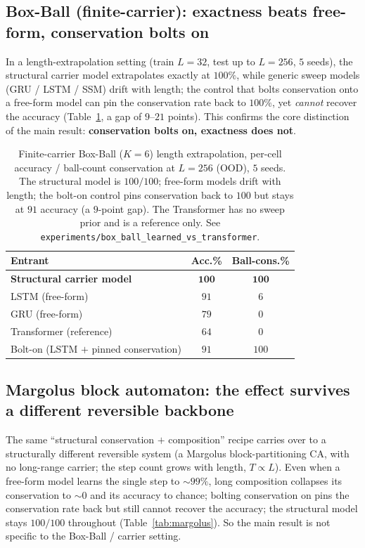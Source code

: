 \documentclass[11pt]{article}
\theoremstyle{definition}
\theoremstyle{plain}
\begin{document}
\subsection{Box-Ball (finite-carrier): exactness beats free-form, conservation bolts on}\label{sec:support:bbs}
In a length-extrapolation setting (train $L=32$, test up to $L=256$, $5$ seeds), the structural
carrier model extrapolates exactly at $100\%$, while generic sweep models (GRU / LSTM / SSM) drift
with length; the control that bolts conservation onto a free-form model can pin the conservation rate
back to $100\%$, yet \emph{cannot} recover the accuracy (Table~\ref{tab:boxball}, a gap of $9$--$21$
points). This confirms the core distinction of the main result: \textbf{conservation bolts on,
exactness does not}.

\begin{table}[h]
\centering
\caption{Finite-carrier Box-Ball ($K=6$) length extrapolation, per-cell accuracy / ball-count
conservation at $L=256$ (OOD), $5$ seeds. The structural model is $100/100$; free-form models drift
with length; the bolt-on control pins conservation back to $100$ but stays at $91$ accuracy (a $9$-point
gap). The Transformer has no sweep prior and is a reference only. See
\texttt{experiments/box\_ball\_learned\_vs\_transformer}.}
\label{tab:boxball}
\begin{tabular}{lcc}
\toprule
\textbf{Entrant} & \textbf{Acc.\%} & \textbf{Ball-cons.\%} \\
\midrule
\textbf{Structural carrier model} & $\mathbf{100}$ & $\mathbf{100}$ \\
LSTM (free-form) & $91$ & $6$ \\
GRU (free-form) & $79$ & $0$ \\
Transformer (reference) & $64$ & $0$ \\
Bolt-on (LSTM $+$ pinned conservation) & $91$ & $100$ \\
\bottomrule
\end{tabular}
\end{table}

\subsection{Margolus block automaton: the effect survives a different reversible backbone}\label{sec:support:margolus}
The same ``structural conservation $+$ composition'' recipe carries over to a structurally different
reversible system (a Margolus block-partitioning CA, with no long-range carrier; the step count grows
with length, $T\propto L$). Even when a free-form model learns the single step to $\sim99\%$, long
composition collapses its conservation to $\sim0$ and its accuracy to chance; bolting conservation on
pins the conservation rate back but still cannot recover the accuracy; the structural model stays
$100/100$ throughout (Table~\ref{tab:margolus}). So the main result is not specific to the
Box-Ball / carrier setting.
\end{document}
